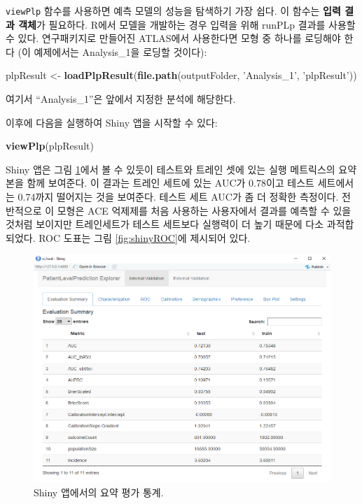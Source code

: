 \documentclass[11pt]{book}
\newenvironment{Shaded}{\begin{snugshade}}{\end{snugshade}}
\newcommand{\KeywordTok}[1]{\textcolor[rgb]{0.13,0.29,0.53}{\textbf{#1}}}
\newcommand{\StringTok}[1]{\textcolor[rgb]{0.31,0.60,0.02}{#1}}
\newcommand{\NormalTok}[1]{#1}
\theoremstyle{definition}
\theoremstyle{definition}
\theoremstyle{definition}
\theoremstyle{remark}
\begin{document}
\texttt{viewPlp} 함수를 사용하면 예측 모델의 성능을 탐색하기 가장 쉽다.
이 함수는 \textbf{입력 결과 객체}가 필요하다. R에서 모델을 개발하는 경우
입력을 위해 runPLp 결과를 사용할 수 있다. 연구패키지로 만들어진
ATLAS에서 사용한다면 모형 중 하나를 로딩해야 한다 (이 예제에서는
Analysis\_1을 로딩할 것이다): 

\begin{Shaded}
\begin{Highlighting}[]
\NormalTok{plpResult <-}\StringTok{ }\KeywordTok{loadPlpResult}\NormalTok{(}\KeywordTok{file.path}\NormalTok{(outputFolder, }
                                     \StringTok{'Analysis_1'}\NormalTok{, }
                                     \StringTok{'plpResult'}\NormalTok{))}
\end{Highlighting}
\end{Shaded}

여기서 ``Analysis\_1''은 앞에서 지정한 분석에 해당한다.

이후에 다음을 실행하여 Shiny 앱을 시작할 수 있다:

\begin{Shaded}
\begin{Highlighting}[]
\KeywordTok{viewPlp}\NormalTok{(plpResult)}
\end{Highlighting}
\end{Shaded}

Shiny 앱은 그림 \ref{fig:shinySummary}에서 볼 수 있듯이 테스트와 트레인
셋에 있는 실행 메트릭스의 요약본을 함께 보여준다. 이 결과는 트레인
세트에 있는 AUC가 0.78이고 테스트 세트에서는 0.74까지 떨어지는 것을
보여준다. 테스트 세트 AUC가 좀 더 정확한 측정이다. 전반적으로 이 모형은
ACE 억제제를 처음 사용하는 사용자에서 결과를 예측할 수 있을 것처럼
보이지만 트레인세트가 테스트 세트보다 실행력이 더 높기 때문에 다소
과적합되었다. ROC 도표는 그림 \ref{fig:shinyROC}에 제시되어 있다.

\begin{figure}
\includegraphics[width=1\linewidth]{images/PatientLevelPrediction/shinysummary} \caption{Shiny 앱에서의 요약 평가 통계.}\label{fig:shinySummary}
\end{figure}
\end{document}

